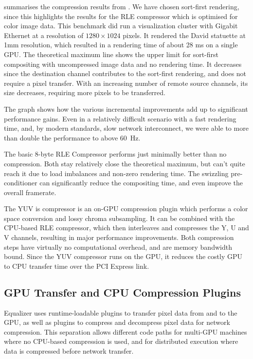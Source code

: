  summarises the compression results from \cite{MEP:10}. We have
chosen sort-first rendering, since this highlights the results for the RLE
compressor which is optimised for color image data. This benchmark did run a
visualization cluster with Gigabit Ethernet at a resolution of $1280\times
1024$ pixels. It rendered the David statuette at 1mm resolution, which resulted
in a rendering time of about 28 ms on a single GPU. The theoretical maximum
line shows the upper limit for sort-first compositing with uncompressed image
data and no rendering time. It decreases since the destination channel
contributes to the sort-first rendering, and does not require a pixel transfer.
With an increasing number of remote source channels, its size decreases,
requiring more pixels to be transferred.

The graph shows how the various incremental improvements add up to significant
performance gains. Even in a relatively difficult scenario with a fast
rendering time, and, by modern standards, slow network interconnect, we were
able to more than double the performance to above 60~Hz.

The basic 8-byte RLE Compressor performs just minimally better than no
compression. Both stay relatively close the theoretical maximum, but can't
quite reach it due to load imbalances and non-zero rendering time. The
swizzling pre-conditioner can significantly reduce the compositing time, and
even improve the overall framerate.

The YUV is compressor is an on-GPU compression plugin which performs a
color space conversion and lossy chroma subsampling. It can be combined with the
CPU-based RLE compressor, which then interleaves and compresses the Y, U and V
channels, resulting in major performance improvements. Both compression steps
have virtually no computational overhead, and are memory bandwidth bound. Since
the YUV compressor runs on the GPU, it reduces the costly GPU to CPU transfer
time over the PCI Express link.

\subsection{GPU Transfer and CPU Compression Plugins}

Equalizer uses runtime-loadable plugins to transfer pixel data from and to the
GPU, as well as plugins to compress and decompress pixel data for network
compression. This separation allows different code paths for multi-GPU machines
where no CPU-based compression is used, and for distributed execution where data
is compressed before network transfer.

